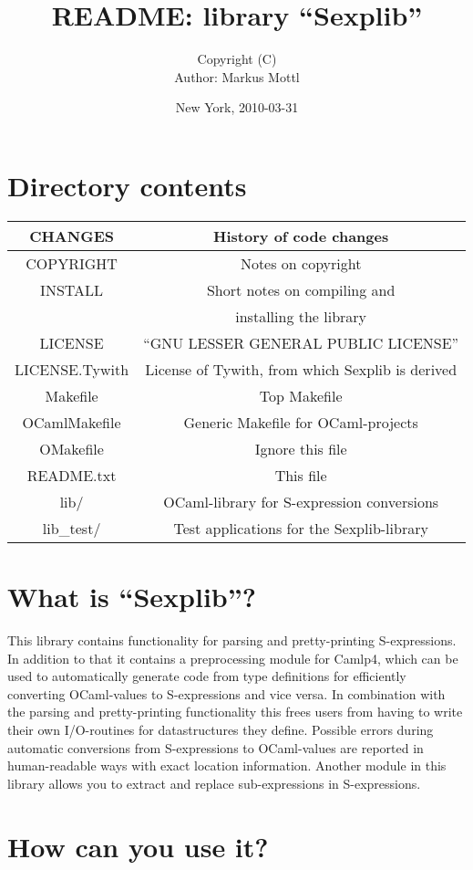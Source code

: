 \documentclass[a4paper]{article}
\title{README: library ``Sexplib''}
\author{
  Copyright \quad (C) \quad \theyear \quad \janeshort \quad\\
  Author: Markus Mottl
}
\date{New York, 2010-03-31}
\newcommand{\trow}[2]{\quad #1 \quad&\quad #2 \quad\\}
\newcommand{\trowl}[2]{\trow{#1}{#2}\hline}
\begin{document}
\maketitle
\section{Directory contents}
\begin{center}
\begin{tabular}{|c|c|}
\hline
\trowl{CHANGES}{History of code changes}
\trowl{COPYRIGHT}{Notes on copyright}
\trow{INSTALL}{Short notes on compiling and}
\trowl{}{installing the library}
\trowl{LICENSE}{``GNU LESSER GENERAL PUBLIC LICENSE''}
\trowl{LICENSE.Tywith}{License of Tywith, from which Sexplib is derived}
\trowl{Makefile}{Top Makefile}
\trowl{OCamlMakefile}{Generic Makefile for OCaml-projects}
\trowl{OMakefile}{Ignore this file}
\trowl{README.txt}{This file}
\trowl{lib/}{OCaml-library for S-expression conversions}
\trowl{lib\_test/}{Test applications for the Sexplib-library}
\end{tabular}
\end{center}

\section{What is ``Sexplib''?}

This library contains functionality for parsing and pretty-printing
S-expressions.  In addition to that it contains a preprocessing module for
Camlp4, which can be used to automatically generate code from type definitions
for efficiently converting OCaml-values to S-expressions and vice versa.
In combination with the parsing and pretty-printing functionality this frees
users from having to write their own I/O-routines for datastructures they
define.  Possible errors during automatic conversions from S-expressions
to OCaml-values are reported in human-readable ways with exact location
information.  Another module in this library allows you to extract and
replace sub-expressions in S-expressions.

\section{How can you use it?}
\end{document}

